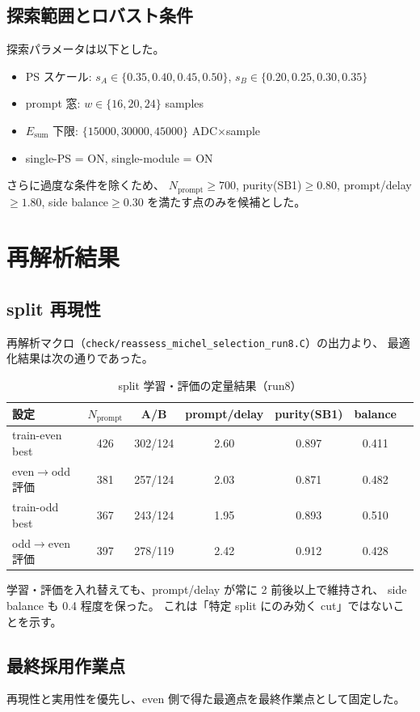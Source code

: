 \documentclass[a4paper,11pt]{jsarticle}
\begin{document}
\subsection{探索範囲とロバスト条件}
探索パラメータは以下とした。
\begin{itemize}
  \item PS スケール: $s_A \in \{0.35,0.40,0.45,0.50\}$, $s_B \in \{0.20,0.25,0.30,0.35\}$
  \item prompt 窓: $w \in \{16,20,24\}$ samples
  \item $E_{\mathrm{sum}}$ 下限: $\{15000,30000,45000\}$ ADC$\times$sample
  \item single-PS = ON, single-module = ON
\end{itemize}
さらに過度な条件を除くため、
$N_{\mathrm{prompt}}\ge 700$, purity(SB1)$\ge0.80$, prompt/delay$\ge1.80$, side balance$\ge0.30$
を満たす点のみを候補とした。

\section{再解析結果}
\subsection{split 再現性}
再解析マクロ（\texttt{check/reassess\_michel\_selection\_run8.C}）の出力より、
最適化結果は次の通りであった。

\begin{table}[htbp]
\centering
\caption{split 学習・評価の定量結果（run8）}
\label{tab:split}
\begin{tabular}{lcccccc}
\toprule
設定 & $N_{\mathrm{prompt}}$ & A/B & prompt/delay & purity(SB1) & balance \\
\midrule
train-even best & 426 & 302/124 & 2.60 & 0.897 & 0.411 \\
even$\to$odd 評価 & 381 & 257/124 & 2.03 & 0.871 & 0.482 \\
train-odd best & 367 & 243/124 & 1.95 & 0.893 & 0.510 \\
odd$\to$even 評価 & 397 & 278/119 & 2.42 & 0.912 & 0.428 \\
\bottomrule
\end{tabular}
\end{table}

学習・評価を入れ替えても、prompt/delay が常に 2 前後以上で維持され、
side balance も 0.4 程度を保った。
これは「特定 split にのみ効く cut」ではないことを示す。

\subsection{最終採用作業点}
再現性と実用性を優先し、even 側で得た最適点を最終作業点として固定した。
\end{document}
